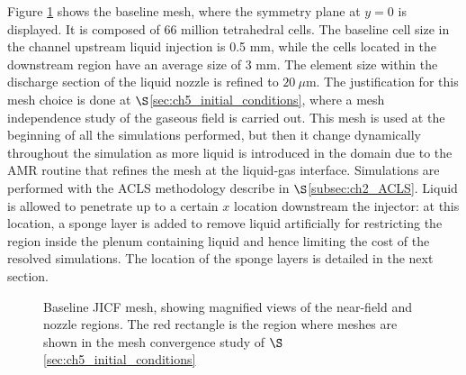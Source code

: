 
Figure \ref{fig:jicf_dlr_mesh} shows the baseline mesh, where the symmetry plane at $y = 0$ is displayed. It is composed of 66 million tetrahedral cells. The baseline cell size in the channel upstream liquid injection is 0.5 mm, while the cells located in the downstream region have an average size of 3 mm. The element size within the discharge section of the liquid nozzle is refined to $20~\mu$m. The justification for this mesh choice is done at $\S$\ref{sec:ch5_initial_conditions}, where a mesh independence study of the gaseous field is carried out. This mesh is used at the beginning of all the simulations performed, but then it change dynamically throughout the simulation as more liquid is introduced in the domain due to the AMR routine that refines the mesh at the liquid-gas interface. Simulations are performed with the ACLS methodology describe in $\S$\ref{subsec:ch2_ACLS}. Liquid is allowed to penetrate up to a certain $x$ location downstream the injector: at this location, a sponge layer is added to remove liquid artificially for restricting the region inside the plenum containing liquid and hence limiting the cost of the resolved simulations. The location of the sponge layers is detailed in the next section.

\begin{figure}[h!]
	\centering	{}
	\caption[Baseline JICF mesh, showing magnified views of the near-field and nozzle regions.]{Baseline JICF mesh, showing magnified views of the near-field and nozzle regions. The red rectangle is the region where meshes are shown in the mesh convergence study of $\S$\ref{sec:ch5_initial_conditions}}
	\label{fig:jicf_dlr_mesh}
\end{figure}

